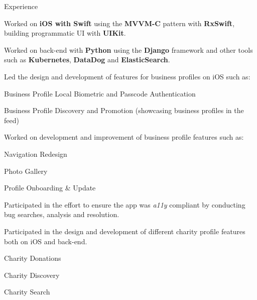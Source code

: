 \documentclass{curriculum}
\begin{document}
\begin{cvsection}{Experience}
\begin{sectionitemlist}
        \item{
            Worked on \textbf{iOS with Swift} using the \textbf{MVVM-C} pattern with \textbf{RxSwift},
            building programmatic UI with \textbf{UIKit}.
        }

        \item{
            Worked on back-end with \textbf{Python} using the \textbf{Django} framework
            and other tools such as \textbf{Kubernetes}, \textbf{DataDog} and \textbf{ElasticSearch}.
        }

        \item{
            Led the design and development of features for business profiles on iOS such as:
        }{
            \begin{colsectionitemlist}{2}
            \item{Business Profile Local Biometric and Passcode Authentication}
            \item{Business Profile Discovery and Promotion (showcasing business profiles in the feed)}
            \end{colsectionitemlist}
        }

        \item{
            Worked on development and improvement of business profile features such as:
        }{
            \begin{colsectionitemlist}{2}
            \item{Navigation Redesign}
            \item{Photo Gallery}
            \item{Profile Onboarding \& Update}
            \end{colsectionitemlist}
        }

        \item{
            Participated in the effort to ensure the app was \textit{a11y} compliant
            by conducting bug searches, analysis and resolution.
        }

        \item{
            Participated in the design and development of
            different charity profile features both on iOS and back-end.
        }{
            \begin{colsectionitemlist}{3}
            \item{Charity Donations}
            \item{Charity Discovery}
            \item{Charity Search}
            \end{colsectionitemlist}
        }


\end{sectionitemlist}
\end{cvsection}
\end{document}
